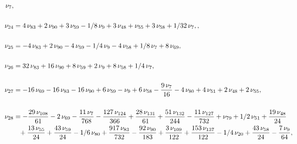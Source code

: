 \documentclass[a4paper,12pt, DIV=14, BCOR=5mm, twoside, headsepline, numbers=noenddot]{scrbook}
\begin{document}
\begin{align}
\begin{aligned}
\nu_{{7}}, \\
\\
\nu_{{24}}&=4\,\nu_{{83}}+2\,\nu_{{90}}+3\,\nu_{{59}}-1/8\,
\nu_{{9}}+3\,\nu_{{48}}+\nu_{{55}}+3\,\nu_{{58}}+1/32\,\nu_{{7}},, \\
\\
\nu_{{25}}&=-4\,\nu_{{83}}+2\,\nu_{{90}}-4\,\nu_{{59}}-1/4\,\nu_{{9}}-4\,\nu
_{{58}}+1/8\,\nu_{{7}}+8\,\nu_{{69}}, \\
\\
\nu_{{26}}&=32\,\nu_{{83}}+16\,\nu_{{90}}+8\,\nu_{{59}}+2\,\nu_{{9}}+8\,\nu_{{58}}+1/4\,\nu_{{7}}, \\
\\
\nu_{{
27}}&=-16\,\nu_{{69}}-16\,\nu_{{83}}-16\,\nu_{{90}}+6\,\nu_{{59}}-\nu_{
{9}}+6\,\nu_{{58}}-{\frac {9\,\nu_{{7}}}{16}}-4\,\nu_{{80}}+4\,\nu_{{
51}}+2\,\nu_{{48}}+2\,\nu_{{55}}, \\
\\
\nu_{{28}}&=-{\frac {29\,\nu_{{108}}}{61}}-2\,\nu_{{69}}-{\frac {11\,\nu_{{7}}}{768}}-{\frac {127\,\nu_{{124}}}{366}}+{\frac {28\,\nu_{{131}}}{61}}+{\frac {51\,\nu_{{132}}}{244}}-{\frac {11\,\nu_{{127}}}{732}}+\nu_{{79}}+1/2\,\nu_{{51}}+{\frac {19\,\nu_{{48}}}{24}}\\
 &\hphantom{=}+{\frac {13\,\nu_{{55}}}{24}}+{\frac {43\,\nu_{{59}}}{24}}-1/6\,\nu_{{80}}+{\frac {917\,\nu_{{83}}}{732}}-{\frac {92\,\nu_
{{90}}}{183}}+{\frac {3\,\nu_{{109}}}{122}}+{\frac {153\,\nu_{{137}}}{
122}}-1/4\,\nu_{{20}}+{\frac {43\,\nu_{{58}}}{24}}-{\frac {7\,\nu_{{9}
}}{64}},
\end{aligned}
\end{align}
\end{document}
